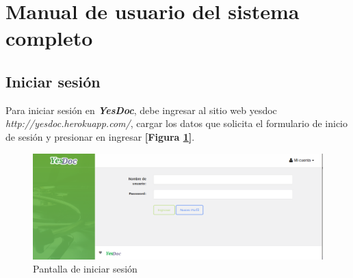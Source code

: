 \section{Manual de usuario del sistema completo}
\label{manual_usuario}

\subsection{Iniciar sesión}
Para iniciar sesión en \textbf{\textit{YesDoc}}, debe ingresar al sitio web yesdoc \textit{http://yesdoc.herokuapp.com/}, cargar los datos que solicita el formulario de inicio de sesión y presionar en ingresar \textbf{[Figura \ref{mu-iniciar_sesion}]}.
 \begin{figure}
 	\centering
 	\includegraphics[width=.8\textwidth]{img/manual_de_usuario/iniciar_sesion}
 	\caption{Pantalla de iniciar sesión}
 	\label{mu-iniciar_sesion}
 \end{figure}

